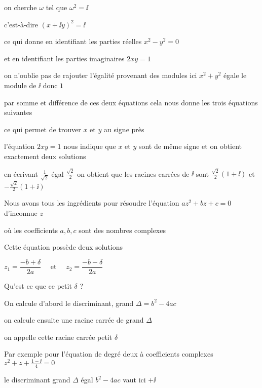 \change

on cherche $\omega$ tel que $\omega^2=\ii$

\change

c'est-à-dire $( x + \ii y )^2 = \ii$

ce qui donne en identifiant les parties réelles $x^2-y^2=0$ 

et en identifiant les parties imaginaires $2xy=1$

\change

on n'oublie pas de rajouter l'égalité provenant des modules
ici $x^2+y^2$ égale le module de $\ii$ donc $1$


\change

par somme et différence de ces deux équations
cela nous donne les trois équations suivantes

\change

ce qui permet de trouver $x$ et $y$ au signe près

\change

l'équation $2xy=1$ nous indique que $x$ et $y$ sont de même
signe et on obtient exactement deux solutions

\change

en écrivant $\frac 1 {\sqrt 2}$ égal $\frac{\sqrt{2}}{2}$ on obtient
que les racines carrées de $\ii$ sont $\frac{\sqrt{2}}{2}(1+\ii)$ et $-\frac{\sqrt{2}}{2}(1+\ii)$


\diapo
Nous avons tous les ingrédients pour résoudre
 l'équation $az^2 + bz + c = 0$
d'inconnue $z$

où les coefficients $a, b, c$ sont des nombres complexes

Cette équation possède deux solutions 

 $ z_1 = \dfrac{- b + \delta}{2 a} \quad \text{ et } \quad z_2 = \dfrac{- b - \delta}{2a}$

\change

Qu'est ce que ce petit $\delta$ ?

On calcule d'abord le discriminant, grand $\Delta = b^2-4ac$

on calcule ensuite une racine carrée  de grand $\Delta$

on appelle cette racine carrée petit $\delta$

\change

Par exemple pour l'équation de degré deux à coefficients complexes 
$z^2 + z + \frac{1 - \ii }{4}=0$

\change

le discriminant grand $\Delta$ égal $b^2-4ac$ vaut ici $+\ii $ 

